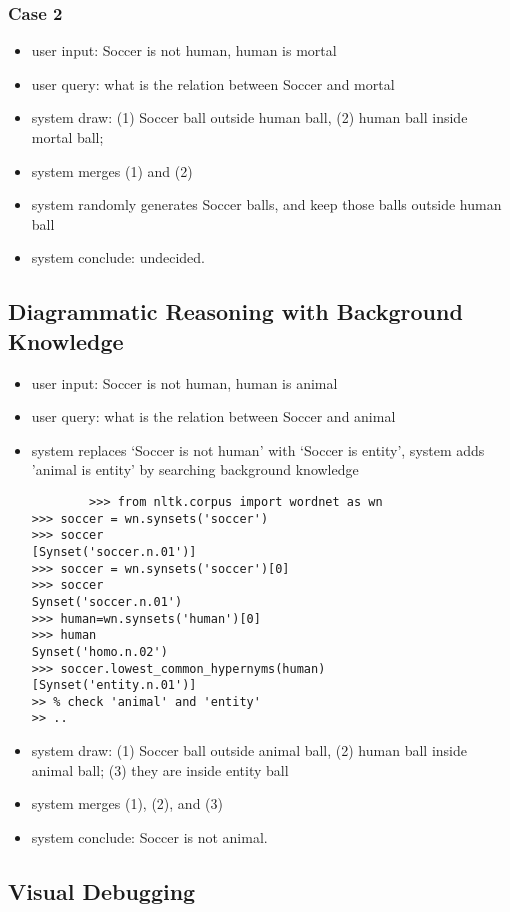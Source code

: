 \documentclass[runningheads]{llncs}
\begin{document}
\subsubsection{Case 2}
\begin{itemize}
	\item user input: Soccer is not human, human is mortal
	\item  user query: what is the relation between Soccer and mortal
	\item  system draw: (1) Soccer ball outside human ball, (2) human ball inside mortal ball; 
	\item system merges (1) and (2) 
	\item system randomly generates Soccer balls, and keep those balls outside human ball
	\item system conclude: undecided.
\end{itemize}
 
\subsection{Diagrammatic Reasoning with Background Knowledge} 
\begin{itemize}
	\item user input: Soccer is not human, human is animal
	\item  user query: what is the relation between Soccer and animal
	\item  system replaces `Soccer is not human' with `Soccer is entity', system adds 'animal is entity' by searching background knowledge
	\begin{verbatim}
		>>> from nltk.corpus import wordnet as wn
>>> soccer = wn.synsets('soccer')
>>> soccer
[Synset('soccer.n.01')]
>>> soccer = wn.synsets('soccer')[0]
>>> soccer
Synset('soccer.n.01')
>>> human=wn.synsets('human')[0]
>>> human
Synset('homo.n.02') 
>>> soccer.lowest_common_hypernyms(human)
[Synset('entity.n.01')] 
>> % check 'animal' and 'entity'
>> ..
	\end{verbatim}
\item  system draw: (1) Soccer ball outside animal ball, (2) human ball inside animal ball; (3) they are inside entity ball 
	\item system merges (1), (2), and (3)  
	\item system conclude: Soccer is not animal.
\end{itemize}

\subsection{Visual Debugging}
\end{document}
